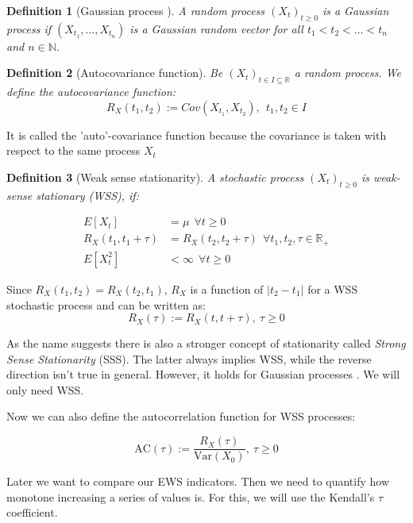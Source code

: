 \documentclass[%
thesis=student,%
coverpage=false,%
titlepage=false,%
headmarks=true, %
english,%
font=libertine, %
math=newpxtx, %
BCOR=5mm,%
coverBCOR=11mm%
]{tumbook}
\newtheorem{definition}{Definition}[section]
\begin{document}
\begin{definition}[Gaussian process \cite{gantert:2024}]
    A random process $(X_{t})_{t\geq 0}$ is a Gaussian process if $(X_{t_{1}},...,X_{t_{n}})$ is a Gaussian random vector for all $t_{1} < t_{2} < ... < t_{n}$  and $n \in \mathbb{N}$.
\end{definition}


\begin{definition}[Autocovariance function]
Be $(X_{t})_{t \in I \subseteq \mathbb{R}}$ a random process. We define the autocovariance function: 
\[
R_{X}(t_{1},t_{2}) := Cov(X_{t_{1}},X_{t_{2}}), \ \ t_{1},t_{2} \in I
\]    
\end{definition}

It is called the 'auto'-covariance function because the covariance is taken with respect to the same process $X_{t}$


\begin{definition}[Weak sense stationarity]
A stochastic process $(X_{t})_{t\geq 0}$ is weak-sense stationary (WSS), if:

\begin{subequations}
    \begin{align}
        E[X_{t}] &= \mu \ \ \forall t \geq 0 \\
        R_{X}(t_{1},t_{1} + \tau) &= R_{X}(t_{2},t_{2} + \tau) \ \ \forall t_{1},t_{2},\tau \in \mathbb{R}_{+} \\
        E[X_{t}^2]&<\infty \ \ \forall t \geq 0
    \end{align}
\end{subequations}   
\end{definition}

Since $R_{X}(t_{1},t_{2}) = R_{X}(t_{2},t_{1})$, $R_{X}$ is a function of $\lvert t_{2} - t_{1} \rvert$ for a WSS stochastic process and can be written as:
\[
R_{X}(\tau) := R_{X}(t,t + \tau), \ \tau \geq 0
\]

As the name suggests there is also a stronger concept of stationarity called \textit{Strong Sense Stationarity} (SSS). The latter always implies WSS, while the reverse direction isn't true in general. However, it holds for Gaussian processes \cite{Gallager:2014}. We will only need WSS.

Now we can also define the autocorrelation function for WSS processes:

\[
\text{AC}(\tau) := \frac{R_{X}(\tau)}{\text{Var}(X_{0})}, \ \tau \geq 0
\]

Later we want to compare our EWS indicators. Then we need to quantify how monotone increasing a series of values is. For this, we will use the Kendall's $\tau$ coefficient. 
\end{document}
